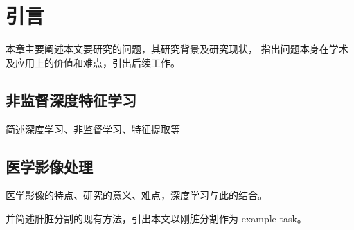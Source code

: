 
\chapter{引言}
本章主要阐述本文要研究的问题，其研究背景及研究现状，
指出问题本身在学术及应用上的价值和难点，引出后续工作。

\section{非监督深度特征学习}
简述深度学习、非监督学习、特征提取等

\section{医学影像处理}
医学影像的特点、研究的意义、难点，深度学习与此的结合。

并简述肝脏分割的现有方法，引出本文以刚脏分割作为 example task。

